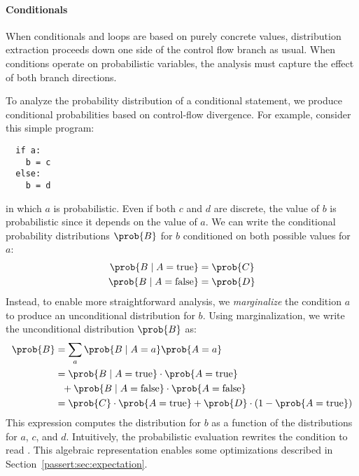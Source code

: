 
\label{passert:sec:conditionals}


\paragraph{Conditionals}
When conditionals and loops are based on purely
concrete values, distribution extraction proceeds down one side
of the control flow branch as usual. When conditions operate on probabilistic variables, the analysis
must capture the effect of both branch directions.

To analyze the probability distribution of a conditional statement,
we produce conditional probabilities
based on control-flow divergence. For example, consider this simple
program:
%
\begin{lstlisting}
  if a:
    b = c
  else:
    b = d
\end{lstlisting}
%
in which $a$ is probabilistic. Even if both $c$
and $d$ are discrete, the value of $b$ is probabilistic since it depends on
the value of $a$. We can write the conditional probability distributions $\prob{B}$
for $b$ conditioned on both possible values for $a$:
%
\begin{align*}
    \prob{B \;|\; A = \mathrm{true}} &= \prob{C}\\
    \prob{B \;|\; A = \mathrm{false}} &= \prob{D}
\end{align*}
%
Instead, to enable more
straightforward analysis, we \emph{marginalize} the condition $a$ to
produce an unconditional distribution for $b$. Using marginalization, we
write the unconditional distribution $\prob{B}$ as:
%
\begin{align*}
    \prob{B} &= \sum_a \prob{B\;|\; A = a} \prob{A = a} \\
           &= \prob{B \;|\; A = \mathrm{true}} \cdot \prob{A = \mathrm{true}}
    \\
    & \> \> \> + \prob{B \;|\; A = \mathrm{false}} \cdot \prob{A = \mathrm{false}} \\
           &= \prob{C} \cdot \prob{A=\mathrm{true}}
            + \prob{D} \cdot (1 - \prob{A=\mathrm{true}})
\end{align*}
%
This expression computes the distribution for $b$ as a function of the
distributions for $a$, $c$, and $d$. Intuitively, the probabilistic evaluation rewrites
the condition to read . This algebraic
representation enables some optimizations described
in Section~\ref{passert:sec:expectation}.

